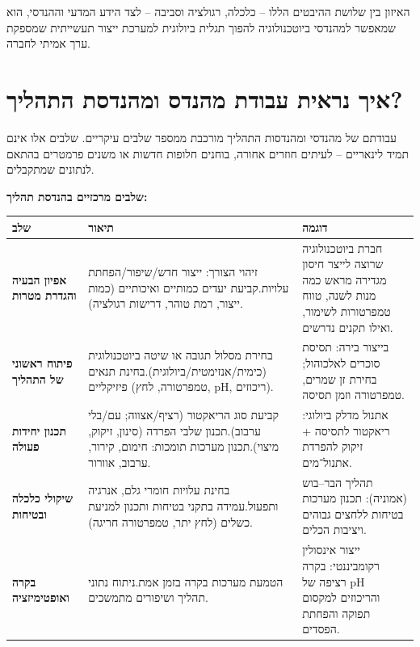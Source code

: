 \documentclass[
  hebrew,
  letterpaper,
  DIV=11,
  numbers=noendperiod]{scrreprt}
\begin{document}
{האיזון בין שלושת ההיבטים הללו -- כלכלה, רגולציה וסביבה -- לצד הידע
המדעי וההנדסי, הוא שמאפשר למהנדסי ביוטכנולוגיה להפוך תגלית ביולוגית
למערכת ייצור תעשייתית שמספקת ערך אמיתי לחברה}.

\section{\texorpdfstring{{איך נראית עבודת מהנדס ומהנדסת
התהליך}?}{איך נראית עבודת מהנדס ומהנדסת התהליך?}}\label{ux5d0ux5d9ux5da-ux5e0ux5e8ux5d0ux5d9ux5ea-ux5e2ux5d1ux5d5ux5d3ux5ea-ux5deux5d4ux5e0ux5d3ux5e1-ux5d5ux5deux5d4ux5e0ux5d3ux5e1ux5ea-ux5d4ux5eaux5d4ux5dcux5d9ux5da}

{עבודתם של מהנדסי ומהנדסות התהליך מורכבת ממספר שלבים עיקריים. שלבים אלו
אינם תמיד לינאריים -- לעיתים חוזרים אחורה, בוחנים חלופות חדשות או משנים
פרמטרים בהתאם לנתונים שמתקבלים}.

\textbf{{שלבים מרכזיים בהנדסת תהליך:}}

\begin{longtable}[]{@{}
  >{\raggedleft\arraybackslash}p{}
  >{\raggedleft\arraybackslash}p{}
  >{\raggedleft\arraybackslash}p{}@{}}
\toprule\noalign{}
\begin{minipage}[b]{\linewidth}\raggedleft
\textbf{שלב}
\end{minipage} & \begin{minipage}[b]{\linewidth}\raggedleft
\textbf{תיאור}
\end{minipage} & \begin{minipage}[b]{\linewidth}\raggedleft
\textbf{דוגמה}
\end{minipage} \\
\midrule\noalign{}
\endhead
\bottomrule\noalign{}
\endlastfoot
\textbf{אפיון הבעיה והגדרת מטרות} & זיהוי הצורך: ייצור חדש/שיפור/הפחתת
עלויות.קביעת יעדים כמותיים ואיכותיים (כמות ייצור, רמת טוהר, דרישות
רגולציה). & חברת ביוטכנולוגיה שרוצה לייצר חיסון מגדירה מראש כמה מנות
לשנה, טווח טמפרטורות לשימור, ואילו תקנים נדרשים. \\
\textbf{פיתוח ראשוני של התהליך} & בחירת מסלול תגובה או שיטה ביוטכנולוגית
(כימית/אנזימטית/ביולוגית).בחינת תנאים פיזיקליים (טמפרטורה, לחץ, pH,
ריכוזים). & בייצור בירה: תסיסת סוכרים לאלכוהול; בחירת זן שמרים, טמפרטורה
וזמן תסיסה. \\
\textbf{תכנון יחידות פעולה} & קביעת סוג הריאקטור (רציף/אצווה; עם/בלי
ערבוב).תכנון שלבי הפרדה (סינון, זיקוק, מיצוי).תכנון מערכות תומכות:
חימום, קירור, ערבוב, אוורור. & אתנול מדלק ביולוגי: ריאקטור לתסיסה +
זיקוק להפרדת אתנול־מים. \\
\textbf{שיקולי כלכלה ובטיחות} & בחינת עלויות חומרי גלם, אנרגיה
ותפעול.עמידה בתקני בטיחות ותכנון למניעת כשלים (לחץ יתר, טמפרטורה חריגה).
& תהליך הבר--בוש (אמוניה): תכנון מערכות בטיחות ללחצים גבוהים ויציבות
הכלים. \\
\textbf{בקרה ואופטימיזציה} & הטמעת מערכות בקרה בזמן אמת.ניתוח נתוני
תהליך ושיפורים מתמשכים. & ייצור אינסולין רקומביננטי: בקרה רציפה של pH
והריכוזים למקסום תפוקה והפחתת הפסדים. \\
\end{longtable}
\end{document}
